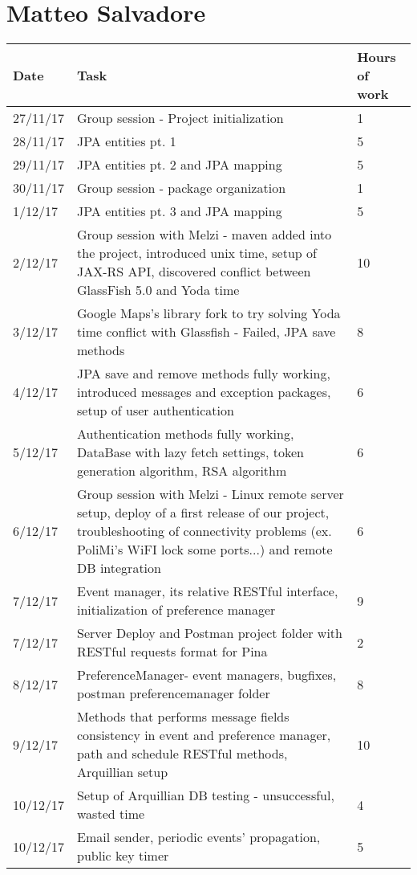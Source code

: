 \section{Matteo Salvadore}

\begin{longtable}{ p{2cm} p{10cm} p{3cm}}
	Date & Task & Hours of work\\
	\hline
	27/11/17 & Group session - Project initialization & 1 \\
	28/11/17 & JPA entities pt. 1 & 5 \\
	29/11/17 & JPA entities pt. 2 and JPA mapping & 5 \\
	30/11/17 & Group session - package organization & 1 \\
	1/12/17 & JPA entities pt. 3 and JPA mapping & 5 \\
	2/12/17 & Group session with Melzi - maven added into the project, introduced unix time, setup of JAX-RS API, discovered conflict between GlassFish 5.0 and Yoda time & 10 \\
	3/12/17 & Google Maps's library fork to try solving Yoda time conflict with Glassfish - Failed, JPA save methods & 8 \\
	4/12/17 & JPA save and remove methods fully working, introduced messages and exception packages, setup of user authentication & 6 \\
	5/12/17 & Authentication methods fully working, DataBase with lazy fetch settings, token generation algorithm, RSA algorithm & 6 \\
	6/12/17 & Group session with Melzi - Linux remote server setup, deploy of a first release of our project, troubleshooting of connectivity problems (ex. PoliMi's WiFI lock some ports...) and remote DB integration & 6 \\
	7/12/17 & Event manager, its relative RESTful interface, initialization of preference manager & 9 \\
	7/12/17 & Server Deploy and Postman project folder with RESTful requests format for Pina & 2 \\
	8/12/17 & PreferenceManager- event managers, bugfixes, postman preferencemanager folder & 8 \\
	9/12/17 & Methods that performs message fields consistency in event and preference manager, path and schedule RESTful methods, Arquillian setup & 10 \\
	10/12/17 & Setup of Arquillian DB testing - unsuccessful, wasted time & 4 \\
	10/12/17 & Email sender, periodic events' propagation, public key timer & 5 \\

\end{longtable}
